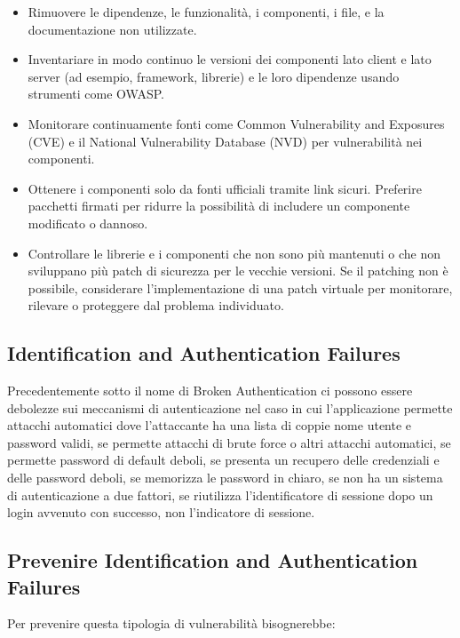 \begin{itemize}
    \item Rimuovere le dipendenze, le funzionalità, i componenti, i file, e la documentazione non utilizzate.
    \item Inventariare in modo continuo le versioni dei componenti lato client e lato server (ad esempio, framework, librerie) e le loro dipendenze usando strumenti come OWASP.
    \item Monitorare continuamente fonti come Common Vulnerability and Exposures (CVE) e il National Vulnerability Database (NVD) per vulnerabilità nei componenti.
    \item Ottenere i componenti solo da fonti ufficiali tramite link sicuri. Preferire pacchetti firmati per ridurre la possibilità di includere un componente modificato o dannoso.
    \item Controllare le librerie e i componenti che non sono più mantenuti o che non sviluppano più patch di sicurezza per le vecchie versioni. Se il patching non è possibile, considerare l'implementazione di una patch virtuale per monitorare, rilevare o proteggere dal problema individuato.
\end{itemize}

\subsection{Identification and Authentication Failures}
Precedentemente sotto il nome di Broken Authentication ci possono essere debolezze sui meccanismi di autenticazione nel caso in cui l’applicazione permette attacchi automatici dove l’attaccante ha una lista di coppie nome utente e password validi, se permette attacchi di brute force o altri attacchi automatici, se permette password di default deboli, se presenta un recupero delle credenziali e delle password deboli, se memorizza le password in chiaro, se non ha un sistema di autenticazione a due fattori, se riutilizza l’identificatore di sessione dopo un login avvenuto con successo, non l’indicatore di sessione.
\subsection{Prevenire Identification and Authentication Failures}
Per prevenire questa tipologia di vulnerabilità bisognerebbe: 

